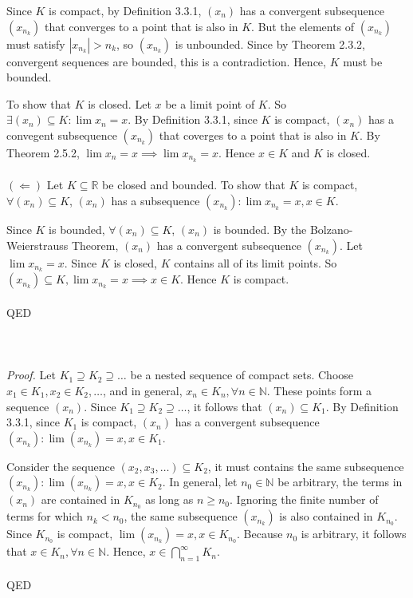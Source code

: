 \documentclass{article}
\begin{document}
            Since $K$ is compact, by Definition 3.3.1, $(x_n)$ has a convergent subsequence $(x_{n_k})$ that converges to a point that is also in $K$. But the elements of $(x_{n_k})$ must satisfy $|x_{n_k}| > n_k$, so $(x_{n_k})$ is unbounded. Since by Theorem 2.3.2, convergent sequences are bounded, this is a contradiction. Hence, $K$ must be bounded.
            
            To show that $K$ is closed. Let $x$ be a limit point of $K$. So $\exists(x_n) \subseteq K: \lim x_n = x$. By Definition 3.3.1, since $K$ is compact, $(x_n)$ has a convegent subsequence $(x_{n_k})$ that coverges to a point that is also in $K$. By Theorem 2.5.2, $\lim x_n = x \implies \lim x_{n_k} = x$. Hence $x \in K$ and $K$ is closed.
            \\ \\
            $(\Leftarrow)$ Let $K \subseteq \mathbb{R}$ be closed and bounded. To show that $K$ is compact, $\forall (x_n) \subseteq K$, $(x_n)$ has a subsequence $(x_{n_k}): \lim x_{n_k} = x, x \in K.$ 
            
            Since $K$ is bounded, $\forall (x_n) \subseteq K$, $(x_n)$ is bounded. By the Bolzano-Weierstrauss Theorem, $(x_n)$ has a convergent subsequence $(x_{n_k})$. Let $\lim x_{n_k} = x$. Since $K$ is closed, $K$ contains all of its limit points. So $(x_{n_k}) \subseteq K, \lim x_{n_k} = x \implies x \in K$. Hence $K$ is compact. \\ \\
            QED
            \\ \\
            \\ \\
            \textit{Proof.} Let $K_1 \supseteq K_2 \supseteq \dots$ be a nested sequence of compact sets. Choose $x_1 \in K_1, x_2 \in K_2, \dots$, and in general, $x_n \in K_n, \forall n \in \mathbb{N}$. These points form a sequence $(x_n)$. Since $K_1 \supseteq K_2 \supseteq \dots$, it follows that $(x_n) \subseteq K_1$. By Definition 3.3.1, since $K_1$ is compact, $(x_n)$ has a convergent subsequence $(x_{n_k}): \lim (x_{n_k}) = x, x \in K_1.$
            
            Consider the sequence $(x_2, x_3, \dots) \subseteq K_2$, it must contains the same subsequence $(x_{n_k}): \lim (x_{n_k}) = x, x \in K_2$. In general, let $n_0 \in \mathbb{N}$ be arbitrary, the terms in $(x_n)$ are contained in $K_{n_0}$ as long as $n \geq n_0$. Ignoring the finite number of terms for which $n_k < n_0$, the same subsequence $(x_{n_k})$ is also contained in $K_{n_0}$. Since $K_{n_0}$ is compact, $\lim (x_{n_k}) = x, x \in K_{n_0}$. Because $n_0$ is arbitrary, it follows that $x \in K_n, \forall n \in \mathbb{N}$. Hence, $x \in \bigcap_{n=1}^\infty K_n$.\\ \\
            QED
            
\end{document}
